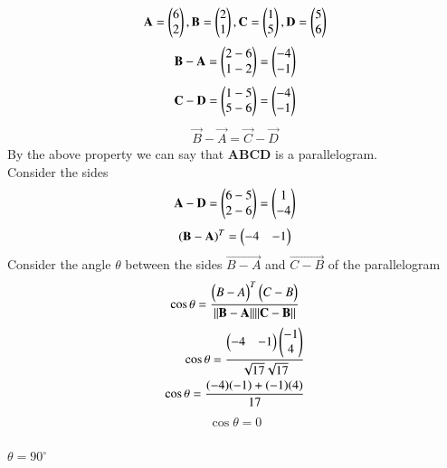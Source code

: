 \documentclass[journal,12pt,onecolumn]{IEEEtran}
\begin{document}
		\begin{align}
			\mathbf{A} = \begin{pmatrix}6\\2\end{pmatrix} ,\mathbf{B}=\begin{pmatrix}2\\1\end{pmatrix} ,\mathbf{C}=\begin{pmatrix}1\\5\end{pmatrix} , \mathbf{D}=\begin{pmatrix}5\\6\end{pmatrix}
		\end{align}
		\begin{align}
		    \mathbf{B}-\mathbf{A}=\begin{pmatrix}2-6\\1-2\end{pmatrix}=\begin{pmatrix}-4\\-1\end{pmatrix}
		\end{align}
        \begin{align}
            \mathbf{C}-\mathbf{D}=\begin{pmatrix}1-5\\5-6\end{pmatrix}=\begin{pmatrix}-4\\-1\end{pmatrix}
        \end{align}
        \begin{align}
            \vec{B}-\vec{A}=\vec{C}-\vec{D}
        \end{align}
        By the above property we can say that \textbf{ABCD} is a parallelogram.\\
        Consider the sides\\
        \begin{align}
            \mathbf{A-D}=\begin{pmatrix}6-5\\2-6\end{pmatrix}=\begin{pmatrix}1\\-4\end{pmatrix}
        \end{align}
        \begin{align}
            \mathbf{(B-A)}^T=\begin{pmatrix}-4 & -1\end{pmatrix}
        \end{align}
      Consider the angle $\theta$ between the sides $\vec{B-A}$ and $\vec{C-B}$ of the parallelogram\\
      \begin{align}
      \cos{\theta}=\frac{\begin{pmatrix}B-A\end{pmatrix}^T\begin{pmatrix}C-B\end{pmatrix}}{\|\mathbf{B-A}\|\|\mathbf{C-B}\|}
      \end{align}
      \begin{align}
          \cos{\theta}=\frac{\begin{pmatrix}-4 & -1\end{pmatrix}\begin{pmatrix}-1\\4\end{pmatrix}}{\sqrt{17}\sqrt{17}}\\
          \cos{\theta}=\frac{(-4)(-1)+(-1)(4)}{17}\\
      \end{align}
      \begin{align}
          \cos{\theta}=0\\
      \end{align}
      \begin{center}
      $\theta=90^\circ$
      \end{center}
\end{document}
